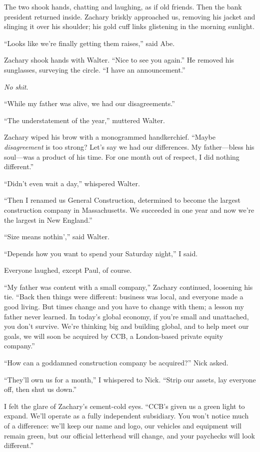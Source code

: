 The two shook hands, chatting and laughing, as if old friends. Then the
bank president returned inside. Zachary briskly approached us, removing
his jacket and slinging it over his shoulder; his gold cuff links
glistening in the morning sunlight.

``Looks like we're finally getting them raises,'' said Abe.

Zachary shook hands with Walter. ``Nice to see you again.'' He removed
his sunglasses, surveying the circle. ``I have an announcement.''

\emph{No shit}.

``While my father was alive, we had our disagreements.''

``The understatement of the year,'' muttered Walter.

Zachary wiped his brow with a monogrammed handkerchief. \linebreak ``Maybe
\emph{disagreement} is too strong? Let's say we had our differences. My
father---bless his soul---was a product of his time. For one month out
of respect, I did nothing different.''

``Didn't even wait a day,'' whispered Walter.

``Then I renamed us General Construction, determined to become the
largest construction company in Massachusetts. We succeeded in one year
and now we're the largest in New England.''

``Size means nothin','' said Walter.

``Depends how you want to spend your Saturday night,'' I said.

Everyone laughed, except Paul, of course.

``My father was content with a small company,'' Zachary continued,
loosening his tie. ``Back then things were different: business was
local, and everyone made a good living. But times change and you have to
change with them; a lesson my father never learned. In today's global
economy, if you're small and unattached, you don't survive. We're
thinking big and building global, and to help meet our goals, we will
soon be acquired by CCB, a London-based private equity company.''

``How can a goddamned construction company be acquired?'' Nick asked.

``They'll own us for a month,'' I whispered to Nick. ``Strip our assets,
lay everyone off, then shut us down.''

I felt the glare of Zachary's cement-cold eyes. ``CCB's given us a green
light to expand. We'll operate as a fully independent subsidiary. You
won't notice much of a difference: we'll keep our name and logo, our
vehicles and equipment will remain green, but our official letterhead
will change, and your paychecks will look different.''

